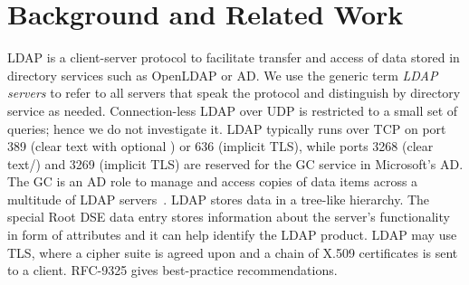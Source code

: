 \section{Background and Related Work}
\label{sec:background}
\acrshort{LDAP} is a client-server protocol to facilitate transfer and access of data stored in directory services such as OpenLDAP or \acrfull{AD}.
We use the generic term \textit{\gls{LDAP} servers} to refer to all servers that speak the protocol and distinguish by directory service as needed. Connection-less \gls{LDAP} over UDP is restricted to a small set of queries; hence we do not investigate it. \gls{LDAP} typically runs over TCP on port 389 (clear text with optional \starttls) or 636 (implicit \gls{TLS}), while ports 3268 (clear text/\starttls) and 3269 (implicit \gls{TLS}) are reserved for the \gls{GC} service in Microsoft’s \gls{AD}. The \gls{GC} is an \gls{AD} role to manage and access copies of data items across a multitude of \gls{LDAP} servers~\cite{alvinashcraft_GlobalCatalogWin32_2020}. \gls{LDAP} stores data in a tree-like hierarchy. The special Root \gls{DSE} data entry stores information about the server's functionality in form of attributes and it can help identify the \gls{LDAP} product. \gls{LDAP} may use \gls{TLS}, where a cipher suite is agreed upon and a chain of X.509 certificates is sent to a client. RFC-9325 gives best-practice recommendations.


